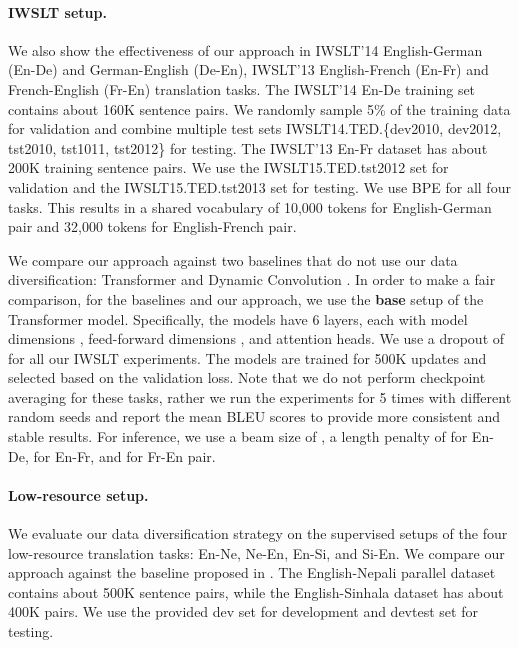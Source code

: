 \documentclass{article}
\begin{document}
\paragraph{IWSLT setup.} We also show the effectiveness of our approach in IWSLT'14 English-German (En-De) and German-English (De-En), IWSLT'13 English-French (En-Fr) and French-English (Fr-En) translation tasks. The IWSLT'14 En-De training set contains about 160K sentence pairs. We randomly sample 5\% of the training data for validation and combine multiple test sets IWSLT14.TED.\{dev2010, dev2012, tst2010, tst1011,  tst2012\} for testing. The IWSLT'13 En-Fr dataset has about 200K training sentence pairs.  We use the IWSLT15.TED.tst2012 set for validation and the IWSLT15.TED.tst2013 set for testing. We use BPE for all four tasks. This results in a shared vocabulary of 10,000 tokens for English-German pair and 32,000 tokens for English-French pair. 

We compare our approach against two baselines that do not use our data diversification: Transformer \citep{vaswani2017attention} and Dynamic Convolution \citep{payless_wu2018}. In order to make a fair comparison, for the baselines and our approach, we use the \textbf{base} setup of the Transformer model. Specifically, the models have 6 layers, each with model dimensions , feed-forward dimensions , and  attention heads. 
We use a dropout of  for all our IWSLT experiments. 
The models are trained for 500K updates and selected based on the validation loss. Note that we do not perform checkpoint averaging for these tasks, rather we run the experiments for 5 times {with different random seeds} and report the mean BLEU scores to provide more consistent and stable results. 
For inference, we use a beam size of , a length penalty of  for En-De,  for En-Fr, and  for Fr-En pair. 

\paragraph{Low-resource setup.} We evaluate our data diversification strategy on the supervised setups of the four low-resource translation tasks: En-Ne, Ne-En, En-Si, and Si-En. We compare our approach against the baseline proposed in \citep{flores}. The  English-Nepali parallel dataset contains about 500K sentence pairs, while the English-Sinhala dataset has about 400K pairs. We use the provided dev set for development and devtest set for testing.
\end{document}
